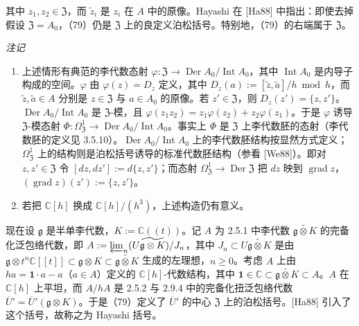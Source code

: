 
其中 $z_{1}, z_{2} \in \mathfrak{Z}$，而 $\tilde{z}_{i}$ 是 $z_{i}$ 在 $A$ 中的原像。Hayashi 在 [Ha88] 中指出：即使去掉假设 $\mathfrak{Z} = A_{0}$，（79）仍是 $\mathfrak{Z}$ 上的良定义泊松括号。特别地，（79）的右端属于 $\mathfrak{Z}$。

\emph{注记}
\begin{enumerate}[label=(\roman*),leftmargin=2.2em]
  \item 上述情形有典范的李代数态射 $\varphi: \mathfrak{Z} \to \operatorname{Der} A_{0}/\operatorname{Int} A_{0}$，其中 $\operatorname{Int} A_{0}$ 是内导子构成的空间。$\varphi$ 由 $\varphi(z) = D_{z}$ 定义，其中 $D_{z}(a) := [\tilde{z}, \tilde{a}]/h \bmod h$，而 $\tilde{z}, \tilde{a} \in A$ 分别是 $z \in \mathfrak{Z}$ 与 $a \in A_{0}$ 的原像。若 $z' \in \mathfrak{Z}$，则 $D_{z}(z') = \{z, z'\}$。$\operatorname{Der} A_{0}/\operatorname{Int} A_{0}$ 是 $\mathfrak{Z}$-模，且 $\varphi(z_{1}z_{2}) = z_{1}\varphi(z_{2}) + z_{2}\varphi(z_{1})$。于是 $\varphi$ 诱导 $\mathfrak{Z}$-模态射 $\Phi: \Omega^{1}_{\mathfrak{Z}} \to \operatorname{Der} A_{0}/\operatorname{Int} A_{0}$。事实上 $\Phi$ 是 $\mathfrak{Z}$ 上李代数胚的态射（李代数胚的定义见 3.5.10）。$\operatorname{Der} A_{0}/\operatorname{Int} A_{0}$ 上的李代数胚结构按显然方式定义；$\Omega^{1}_{\mathfrak{Z}}$ 上的结构则是泊松括号诱导的标准代数胚结构（参看 [We88]）。即对 $z, z' \in \mathfrak{Z}$ 令 $[dz, dz'] := d\{z, z'\}$；而态射 $\Omega^{1}_{\mathfrak{Z}} \to \operatorname{Der} \mathfrak{Z}$ 把 $dz$ 映到 $\operatorname{grad} z$，$(\operatorname{grad} z)(z') := \{z, z'\}$。
  \item 若把 $\mathbb{C}[h]$ 换成 $\mathbb{C}[h]/(h^{3})$，上述构造仍有意义。
\end{enumerate}

 现在设 $\mathfrak{g}$ 是半单李代数，$K := \mathbb{C}((t))$。记 $A$ 为 2.5.1 中李代数 $\widetilde{\mathfrak{g}\otimes K}$ 的完备化泛包络代数，即 $A := \varprojlim_{n}(U\widetilde{\mathfrak{g}\otimes K})/J_{n}$，其中 $J_{n} \subset U\widetilde{\mathfrak{g}\otimes K}$ 是由 $\mathfrak{g}\otimes t^{n}\mathbb{C}[[t]] \subset \mathfrak{g}\otimes K \subset \widetilde{\mathfrak{g}\otimes K}$ 生成的左理想，$n \ge 0$。考虑 $A$ 上由 $ha = \mathbf{1}\cdot a - a$（$a \in A$）定义的 $\mathbb{C}[h]$-代数结构，其中 $\mathbf{1} \in \mathbb{C} \subset \widetilde{\mathfrak{g}\otimes K} \subset A$。$A$ 在 $\mathbb{C}[h]$ 上平坦，而 $A/hA$ 是 2.5.2 与 2.9.4 中的完备化扭泛包络代数 $\overline{U}' = \overline{U}'(\mathfrak{g}\otimes K)$。于是（79）定义了 $\overline{U}'$ 的中心 $\mathfrak{Z}$ 上的泊松括号。[Ha88] 引入了这个括号，故称之为 Hayashi 括号。

